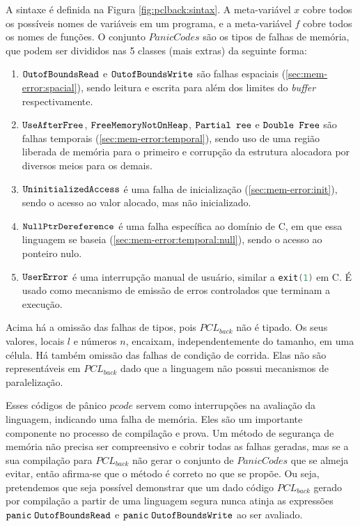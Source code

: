 A sintaxe é definida na Figura \ref{fig:pclback:sintax}. A meta-variável $x$ cobre todos os possíveis nomes de variáveis em um programa, e a meta-variável $f$ cobre todos os nomes de funções. O conjunto $PanicCodes$ são os tipos de falhas de memória, que podem ser divididos nas 5 classes (mais extras) da seguinte forma:
\begin{enumerate}
	\item $\texttt{OutofBoundsRead}$ e $\texttt{OutofBoundsWrite}$ são falhas espaciais (\ref{sec:mem-error:spacial}), sendo leitura e escrita para além dos limites do \emph{buffer} respectivamente.
	\item $\texttt{UseAfterFree}$, $\texttt{FreeMemoryNotOnHeap}$, $\texttt{Partial ree}$ e $\texttt{Double Free}$ são falhas temporais (\ref{sec:mem-error:temporal}), sendo uso de uma região liberada de memória para o primeiro e corrupção da estrutura alocadora por diversos meios para os demais.
	\item $\texttt{UninitializedAccess}$ é uma falha de inicialização (\ref{sec:mem-error:init}), sendo o acesso ao valor alocado, mas não inicializado. 
	\item $\texttt{NullPtrDereference}$ é uma falha específica ao domínio de C, em que essa linguagem se baseia (\ref{sec:mem-error:temporal:null}), sendo o acesso ao ponteiro nulo.
	\item $\texttt{UserError}$ é uma interrupção manual de usuário, similar a \lstinline[language=C]|exit(1)| em C. É usado como mecanismo de emissão de erros controlados que terminam a execução.
\end{enumerate}

\noindent Acima há a omissão das falhas de tipos, pois $PCL_{back}$ não é tipado. Os seus valores, locais $l$ e números $n$, encaixam, independentemente do tamanho, em uma célula. Há também omissão das falhas de condição de corrida. Elas não são representáveis em $PCL_{back}$ dado que a linguagem não possui mecanismos de paralelização.

Esses códigos de pânico $pcode$ servem como interrupções na avaliação da linguagem, indicando uma falha de memória. Eles são um importante componente no processo de compilação e prova. Um método de segurança de memória não precisa ser compreensivo e cobrir todas as falhas geradas, mas se a sua compilação para $PCL_{back}$ não gerar o conjunto de $PanicCodes$ que se almeja evitar, então afirma-se que o método é correto no que se propõe. Ou seja, pretendemos que seja possível demonstrar que um dado código $PCL_{back}$ gerado por compilação a partir de uma linguagem segura nunca atinja as expressões $\texttt{panic}\;\texttt{OutofBoundsRead}$ e $\texttt{panic}\;\texttt{OutofBoundsWrite}$ ao ser avaliado.


